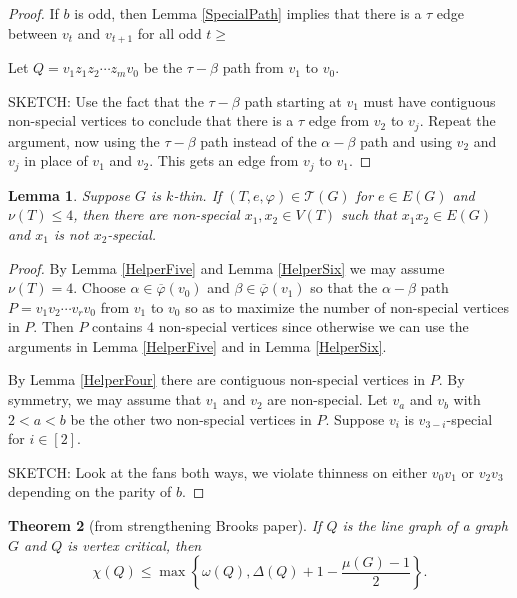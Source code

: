 \documentclass[12pt]{amsart}
\theoremstyle{plain}
\newtheorem{thm}{Theorem}
\newtheorem{lem}[thm]{Lemma}
\theoremstyle{definition}
\theoremstyle{remark}
\newcommand{\fancy}[1]{\mathcal{#1}}
\newcommand{\T}{\fancy{T}}
\newcommand{\irange}[1]{\left[#1\right]}
\newcommand{\vph}{\varphi}
\newcommand{\vphn}{\overline{\varphi}}
\begin{document}
\begin{proof}
If $b$ is odd, then Lemma \ref{SpecialPath} implies that there is a $\tau$ edge
between $v_{t}$ and $v_{t+1}$ for all odd $t \ge $



Let $Q = v_1z_1z_2\cdots z_mv_0$ be the $\tau-\beta$ path from $v_1$ to $v_0$.

SKETCH:  Use the fact that the $\tau-\beta$ path starting at $v_1$ must have contiguous non-special vertices to conclude that there is a $\tau$ edge from $v_2$ to $v_j$.  
Repeat the argument, now using the $\tau-\beta$ path instead of the $\alpha-\beta$ path and using $v_2$ and $v_j$ in place of $v_1$ and $v_2$.  This gets an edge from $v_j$ to $v_1$.
\end{proof}

\begin{lem}\label{HelperSeven}
Suppose $G$ is $k$-thin. If $(T, e, \vph) \in \T(G)$ for $e \in E(G)$ and $\nu(T) \le 4$, then there are non-special $x_1,x_2 \in V(T)$ such that $x_1x_2 \in E(G)$ and $x_1$ is not $x_2$-special.
\end{lem}
\begin{proof}
By Lemma \ref{HelperFive} and Lemma \ref{HelperSix} we may assume $\nu(T) = 4$. 
Choose $\alpha \in \vphn(v_0)$ and $\beta \in \vphn(v_1)$ so that the $\alpha-\beta$ path $P = v_1v_2\cdots v_rv_0$ from $v_1$ to $v_0$ so as to maximize the number of non-special vertices in $P$.
Then $P$ contains $4$ non-special vertices since otherwise we can use the arguments in Lemma \ref{HelperFive} and in Lemma \ref{HelperSix}.

By Lemma \ref{HelperFour} there are contiguous non-special vertices in $P$.  By symmetry, we may assume that $v_1$ and $v_2$ are non-special.  Let $v_a$ and $v_b$ with $2 < a < b$ be the other two non-special vertices in $P$.
Suppose $v_i$ is $v_{3-i}$-special for $i \in \irange{2}$.  

SKETCH: Look at the fans both ways, we violate thinness on either $v_0v_1$ or $v_2v_3$ depending on the parity of $b$.
\end{proof}

\begin{thm}[from strengthening Brooks paper]\label{CriticalMuBound}
If $Q$ is the line graph of a graph $G$ and $Q$ is vertex critical, then
\[\chi(Q) \leq \max\left\{\omega(Q), \Delta(Q) + 1 - \frac{\mu(G) - 1}{2}\right\}.\]
\end{thm}
\end{document}
